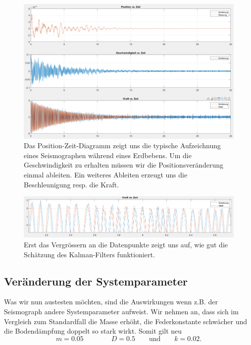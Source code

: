 \begin{figure}
	\begin{center}
		\includegraphics[width=\linewidth,keepaspectratio]{papers/erdbeben/Standard_alles.PNG}
		\caption{Das Position-Zeit-Diagramm zeigt uns die typische Aufzeichnung eines Seismographen während eines Erdbebens. Um die Geschwindigkeit zu erhalten müssen wir die Positionsveränderung einmal ableiten. Ein weiteres Ableiten erzeugt uns die Beschleunigung resp. die Kraft.}
    \label{erdbeben:fig:standard-alles}
	\end{center}
\end{figure}

\begin{figure}
	\begin{center}
		\includegraphics[width=\linewidth,keepaspectratio]{papers/erdbeben/Erdbeben_Standardfall_Zoom.PNG}
		\caption{Erst das Vergrössern an die Datenpunkte zeigt uns auf, wie gut die Schätzung des Kalman-Filters funktioniert.}
    \label{erdbeben:fig:standard-zoom}
	\end{center}
\end{figure}

\subsection{Veränderung der Systemparameter}
Was wir nun austesten möchten, sind die Auswirkungen wenn z.B. der Seismograph andere Systemparameter aufweist.
Wir nehmen an, dass sich im Vergleich zum Standardfall die Masse erhöht, die Federkonstante schwächer und die Bodendämpfung doppelt so stark wirkt.
Somit gilt neu
\[
m = 0.05
\qquad \qquad
D = 0.5
\qquad \text{und} \qquad
k = 0.02.
\]

